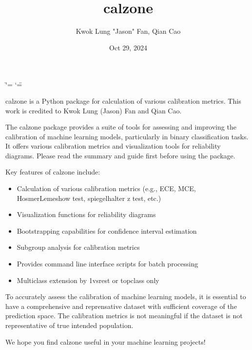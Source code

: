\documentclass[letterpaper,10pt,english]{sphinxmanual}
\title{calzone}
\date{Oct 29, 2024}
\author{Kwok Lung "Jason" Fan, Qian Cao}
\begin{document}
\ifdefined\shorthandoff
  \ifnum\catcode`\=\string=\active\shorthandoff{=}\fi
  \ifnum\catcode`\"=\active{}\fi
\fi

\pagestyle{empty}
\sphinxmaketitle
\pagestyle{plain}
\sphinxtableofcontents
\pagestyle{normal}
\label{\detokenize{index::doc}}


\sphinxAtStartPar
calzone is a Python package for calculation of various calibration metrics. This work is credited to Kwok Lung (Jason) Fan and Qian Cao.

\sphinxAtStartPar
The calzone package provides a suite of tools for assessing and improving the calibration of machine learning models, particularly in binary classification tasks. It offers various calibration metrics and visualization tools for reliability diagrams.  Please read the summary and guide first  before using the package.

\sphinxAtStartPar
Key features of calzone include:
\begin{itemize}
\item {} 
\sphinxAtStartPar
Calculation of various calibration metrics (e.g., ECE, MCE, Hosmer\sphinxhyphen{}Lemeshow test, spiegelhalter z test, etc.)

\item {} 
\sphinxAtStartPar
Visualization functions for reliability diagrams

\item {} 
\sphinxAtStartPar
Bootstrapping capabilities for confidence interval estimation

\item {} 
\sphinxAtStartPar
Subgroup analysis for calibration metrics

\item {} 
\sphinxAtStartPar
Provides command line interface scripts for batch processing

\item {} 
\sphinxAtStartPar
Multi\sphinxhyphen{}class extension by 1\sphinxhyphen{}vs\sphinxhyphen{}rest or top\sphinxhyphen{}class only

\end{itemize}

\sphinxAtStartPar
To accurately assess the calibration of machine learning models, it is essential to have a comprehensive and reprensative dataset with sufficient coverage of the prediction space. The calibration metrics is not meaningful if the dataset is not representative of true intended population.

\sphinxAtStartPar
We hope you find calzone useful in your machine learning projects!
\end{document}
